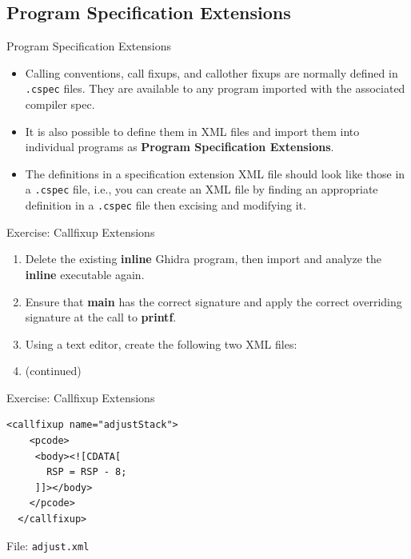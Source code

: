 \documentclass{beamer}
\begin{document}
\subsection{Program Specification Extensions}
\begin{frame}
\begin{block}{Program Specification Extensions}
\begin{itemize}
\item Calling conventions, call fixups, and callother fixups are normally defined in \texttt{.cspec} files.  They are available to any program imported with the associated compiler spec.
\item It is also possible to define them in XML files and import them into individual programs as \textbf{Program Specification Extensions}.
\item The definitions in a specification extension XML file should look like those in a \texttt{.cspec} file, i.e., you can create an XML file by finding an appropriate definition in 
a \texttt{.cspec} file then excising and modifying it. 
\end{itemize}
\end{block}
\end{frame}

\begin{frame}
\begin{block}{Exercise: Callfixup Extensions}
\begin{enumerate}
\item Delete the existing \textbf{inline} Ghidra program, then import and analyze the \textbf{inline} executable again.
\item Ensure that \textbf{main} has the correct signature and apply the correct overriding signature at the call to \textbf{printf}.
\item Using a text editor, create the following two XML files:
\item[] (continued)
\end{enumerate}
\end{block}
\end{frame}

\begin{frame}[fragile]
\begin{block}{Exercise: Callfixup Extensions}
\begin{verbatim}
<callfixup name="adjustStack">
    <pcode>
     <body><![CDATA[
       RSP = RSP - 8;
     ]]></body>
    </pcode>
  </callfixup>
\end{verbatim}
File: \texttt{adjust.xml}
\end{block}
\end{frame}
\end{document}
